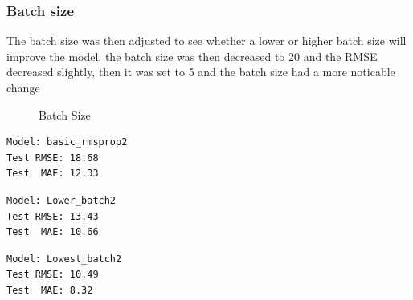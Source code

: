 \documentclass[10pt,11pt,12pt,oneside]{book}
\begin{document}
\subsubsection{Batch size}
The batch size was then adjusted to see whether a lower or higher batch size will improve the model. the batch size was then decreased to 20 and the RMSE decreased slightly, then it was set to 5 and the batch size had a more noticable change\\
\begin{figure}[H]
    \centering
    \qquad
    \caption{Batch Size}%
    \label{fig:batch}%
\end{figure}
\begin{multicols}{3}
\centering
\begin{verbatim}
Model: basic_rmsprop2
Test RMSE: 18.68
Test  MAE: 12.33
\end{verbatim}
\begin{verbatim}
Model: Lower_batch2
Test RMSE: 13.43
Test  MAE: 10.66
\end{verbatim}
\begin{verbatim}
Model: Lowest_batch2
Test RMSE: 10.49
Test  MAE: 8.32
\end{verbatim}
\end{multicols}
\pagebreak
\end{document}
